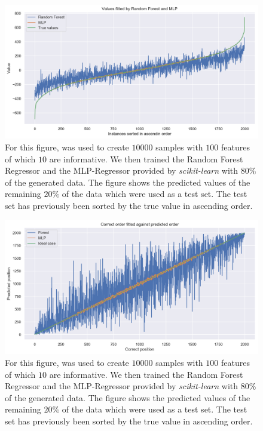 	\begin{figure}[t]
		\centering
		\includegraphics[width=\linewidth]{images/mlp_forest_comparison01.png}
		\caption{For this figure,  was used to create $10000$ samples with $100$ features of which $10$ are informative. We then trained the Random Forest Regressor and the MLP-Regressor provided by \textit{scikit-learn} with $80\%$ of the generated data. The figure shows the predicted values of the remaining $20\%$ of the data which were used as a test set. The test set has previously been sorted by the true value in ascending order.}
		\label{forest_mlp_comp1}
	\end{figure}
	\begin{figure}[t]
		\centering
		\includegraphics[width=\linewidth]{images/mlp_forest_comparison02.png}
		\caption{For this figure,  was used to create $10000$ samples with $100$ features of which $10$ are informative. We then trained the Random Forest Regressor and the MLP-Regressor provided by \textit{scikit-learn} with $80\%$ of the generated data. The figure shows the predicted values of the remaining $20\%$ of the data which were used as a test set. The test set has previously been sorted by the true value in ascending order.}
		\label{forest_mlp_comp2}
	\end{figure}
